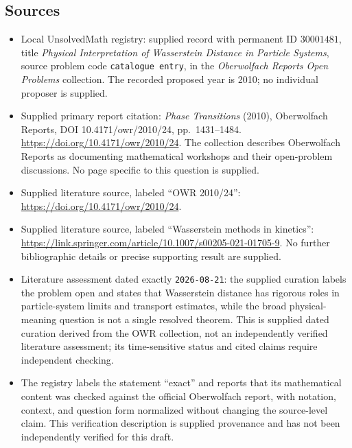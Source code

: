 \documentclass[11pt]{article}
\begin{document}
\subsection{Sources}
\begin{itemize}
\item Local UnsolvedMath registry: supplied record with permanent ID \(30001481\), title \emph{Physical Interpretation of Wasserstein Distance in Particle Systems}, source problem code \texttt{catalogue entry}, in the \emph{Oberwolfach Reports Open Problems} collection. The recorded proposed year is 2010; no individual proposer is supplied.
\item Supplied primary report citation: \emph{Phase Transitions} (2010), Oberwolfach Reports, DOI 10.4171/owr/2010/24, pp.~1431--1484. \url{https://doi.org/10.4171/owr/2010/24}. The collection describes Oberwolfach Reports as documenting mathematical workshops and their open-problem discussions. No page specific to this question is supplied.
\item Supplied literature source, labeled ``OWR 2010/24'': \url{https://doi.org/10.4171/owr/2010/24}.
\item Supplied literature source, labeled ``Wasserstein methods in kinetics'': \url{https://link.springer.com/article/10.1007/s00205-021-01705-9}. No further bibliographic details or precise supporting result are supplied.
\item Literature assessment dated exactly \texttt{2026-08-21}: the supplied curation labels the problem open and states that Wasserstein distance has rigorous roles in particle-system limits and transport estimates, while the broad physical-meaning question is not a single resolved theorem. This is supplied dated curation derived from the OWR collection, not an independently verified literature assessment; its time-sensitive status and cited claims require independent checking.
\item The registry labels the statement ``exact'' and reports that its mathematical content was checked against the official Oberwolfach report, with notation, context, and question form normalized without changing the source-level claim. This verification description is supplied provenance and has not been independently verified for this draft.
\end{itemize}
\end{document}
